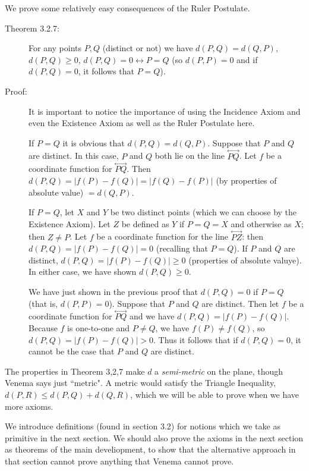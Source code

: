 \documentclass[12pt]{article}
\newcommand\Line[1]{\overset{\leftrightarrow}{#1}}
\begin{document}
We prove some relatively easy consequences of the Ruler Postulate.

\begin{description}

\item[Theorem 3.2.7:]  For any points $P,Q$ (distinct or not) we have $d(P,Q)=d(Q,P)$, $d(P,Q) \geq 0$, $d(P,Q)=0 \leftrightarrow P=Q$ (so $d(P,P)=0$ and if $d(P,Q)=0$, it follows that $P=Q$).

\item[Proof:]  It is important to notice the importance of using the Incidence Axiom and even the Existence Axiom as well as the Ruler Postulate here.

If $P=Q$ it is obvious that $d(P,Q)=d(Q,P)$.  Suppose that $P$ and $Q$ are distinct.  In this case, $P$ and $Q$ both lie on the line $\Line{PQ}$.  Let $f$ be a coordinate function for $\Line{PQ}$.  Then $d(P,Q)= |f(P)-f(Q)| = |f(Q)-f(P)|$ (by properties of absolute value) $=d(Q,P)$.

If $P=Q$, let $X$ and $Y$ be two distinct points (which we can choose by the Existence Axiom).  Let $Z$ be defined as $Y$ if $P=Q=X$ and otherwise as $X$;  then $Z \neq P$.  Let $f$ be a coordinate function for the line $\Line{PZ}$:  then $d(P,Q) = |f(P)-f(Q)| = 0$ (recalling that $P=Q$).  If $P$ and $Q$ are distinct, $d(P,Q)=|f(P)-f(Q)| \geq 0$ (properties of absolute valuye).  In either case, we have shown $d(P,Q) \geq 0$.

We have just shown in the previous proof that $d(P,Q)=0$ if $P=Q$ (that is, $d(P,P)=0$).  Suppose that $P$ and $Q$ are distinct.  Then let $f$ be a coordinate function
for $\Line{PQ}$ and we have $d(P,Q)=|f(P)-f(Q)|$.  Because $f$ is one-to-one and $P\neq Q$, we have $f(P) \neq f(Q)$, so $d(P,Q) = |f(P)-f(Q)|>0$.  Thus it follows
that if $d(P,Q)=0$, it cannot be the case that $P$ and $Q$ are distinct.

\end{description}

The properties in Theorem 3,2,7 make $d$ a {\em semi-metric\/} on the plane, though Venema says just ``metric".  A metric would satisfy the Triangle Inequality,
$d(P,R) \leq d(P,Q)+d(Q,R)$, which we will be able to prove when we have more axioms.

We introduce definitions (found in section 3.2) for notions which we take as primitive in the next section.   We should also prove the axioms in the next section as theorems of the main develiopment, to show that the alternative approach in that section cannot prove anything that Venema cannot prove.
\end{document}
